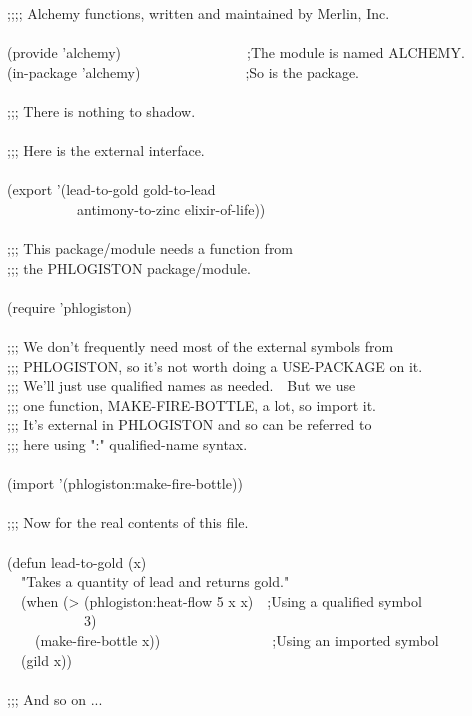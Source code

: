 {\newpage
\clearpage
\samepage \begin{table}%
\caption{File \protect{}}
\label{ALCHEMY-FILE-TABLE}
\begin{lisp}
;;;; Alchemy functions, written and maintained by Merlin, Inc. \\ 
 \\ [4pt]
(provide 'alchemy)~~~~~~~~~~~~~~~~~~;The module is named ALCHEMY. \\ 
(in-package 'alchemy)~~~~~~~~~~~~~~~;So is the package. \\ 
 \\ [4pt]
;;; There is nothing to shadow. \\ 
 \\ [4pt]
;;; Here is the external interface. \\ 
 \\ [4pt]
(export '(lead-to-gold gold-to-lead  \\ 
~~~~~~~~~~antimony-to-zinc elixir-of-life)) \\ 
 \\ [4pt]
;;; This package/module needs a function from \\ 
;;; the PHLOGISTON package/module. \\ 
 \\ [4pt]
(require 'phlogiston) \\ 
 \\ [4pt]
;;; We don't frequently need most of the external symbols from \\ 
;;; PHLOGISTON, so it's not worth doing a USE-PACKAGE on it. \\ 
;;; We'll just use qualified names as needed.~~But we use \\ 
;;; one function, MAKE-FIRE-BOTTLE, a lot, so import it. \\ 
;;; It's external in PHLOGISTON and so can be referred to \\ 
;;; here using ":" qualified-name syntax. \\ 
 \\ [4pt]
(import '(phlogiston:make-fire-bottle)) \\ 
 \\ [4pt]
;;; Now for the real contents of this file. \\ 
 \\ [4pt]
(defun lead-to-gold (x) \\ 
~~"Takes a quantity of lead and returns gold." \\ 
~~(when (> (phlogiston:heat-flow 5 x x)~~;Using a qualified symbol \\ 
~~~~~~~~~~~3) \\ 
~~~~(make-fire-bottle x))~~~~~~~~~~~~~~~~;Using an imported symbol \\ 
~~(gild x)) \\ 
 \\ [4pt]
;;; And so on ...
\end{lisp}
\vfill
\end{table}
}

